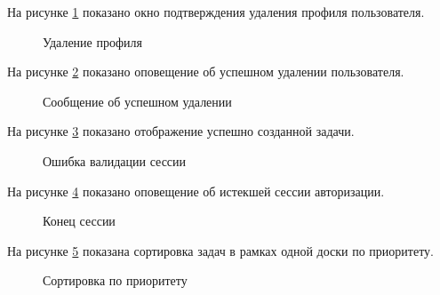 На рисунке \ref{профиль_удаление:image} показано окно подтверждения удаления профиля пользователя.
\begin{figure}[ht]
	\caption{Удаление профиля}
	\label{профиль_удаление:image}
\end{figure}

На рисунке \ref{профиль_удаление_успех:image} показано оповещение об успешном удалении пользователя.
\begin{figure}[ht]
	\caption{Сообщение об успешном удалении}
	\label{профиль_удаление_успех:image}
\end{figure}

\newpage

На рисунке \ref{ошибка_сессия:image} показано отображение успешно созданной задачи.
\begin{figure}[ht]
	\caption{Ошибка валидации сессии}
	\label{ошибка_сессия:image}
\end{figure}

На рисунке \ref{конец_сессии:image} показано оповещение об истекшей сессии авторизации.

\begin{figure}[ht]
	\caption{Конец сессии}
	\label{конец_сессии:image}
\end{figure}

На рисунке \ref{сортировка_проверка:image} показана сортировка задач в рамках одной доски по приоритету.

\newpage

\begin{figure}[ht]
	\caption{Сортировка по приоритету}
	\label{сортировка_проверка:image}
\end{figure}

\newpage
\newpage